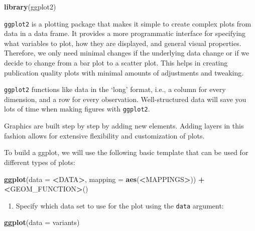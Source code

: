 \documentclass[]{book}
\newenvironment{Shaded}{\begin{snugshade}}{\end{snugshade}}
\newcommand{\DataTypeTok}[1]{\textcolor[rgb]{0.13,0.29,0.53}{#1}}
\newcommand{\ErrorTok}[1]{\textcolor[rgb]{0.64,0.00,0.00}{\textbf{#1}}}
\newcommand{\KeywordTok}[1]{\textcolor[rgb]{0.13,0.29,0.53}{\textbf{#1}}}
\newcommand{\NormalTok}[1]{#1}
\newcommand{\OperatorTok}[1]{\textcolor[rgb]{0.81,0.36,0.00}{\textbf{#1}}}
\newcommand{\StringTok}[1]{\textcolor[rgb]{0.31,0.60,0.02}{#1}}
\providecommand{\tightlist}{%
  \setlength{\itemsep}{0pt}\setlength{\parskip}{0pt}}
\begin{document}
\begin{Shaded}
\begin{Highlighting}[]
\KeywordTok{library}\NormalTok{(ggplot2)}
\end{Highlighting}
\end{Shaded}

\texttt{ggplot2} is a plotting package that makes it simple to create complex plots from data in a data frame. It provides a more programmatic interface for specifying what variables to plot, how they are displayed, and general visual properties. Therefore, we only need minimal changes if the underlying data change or if we decide to change from a bar plot to a scatter plot. This helps in creating publication quality plots with minimal amounts of adjustments and tweaking.

\texttt{ggplot2} functions like data in the `long' format, i.e., a column for every dimension, and a row for every observation. Well-structured data will save you lots of time when making figures with \texttt{ggplot2}.

Graphics are built step by step by adding new elements. Adding layers in this fashion allows for extensive flexibility and customization of plots.

To build a ggplot, we will use the following basic template that can be used for different types of plots:

\begin{Shaded}
\begin{Highlighting}[]
\KeywordTok{ggplot}\NormalTok{(}\DataTypeTok{data =} \OperatorTok{<}\NormalTok{DATA}\OperatorTok{>}\NormalTok{, }\DataTypeTok{mapping =} \KeywordTok{aes}\NormalTok{(}\OperatorTok{<}\NormalTok{MAPPINGS}\OperatorTok{>}\NormalTok{)) }\OperatorTok{+}\StringTok{  }\ErrorTok{<}\NormalTok{GEOM_FUNCTION}\OperatorTok{>}\NormalTok{()}
\end{Highlighting}
\end{Shaded}

\begin{enumerate}
\def\labelenumi{\arabic{enumi}.}
\tightlist
\item
  Specify which data set to use for the plot using the \texttt{data} argument:
\end{enumerate}

\begin{Shaded}
\begin{Highlighting}[]
\KeywordTok{ggplot}\NormalTok{(}\DataTypeTok{data =}\NormalTok{ variants)}
\end{Highlighting}
\end{Shaded}
\end{document}
